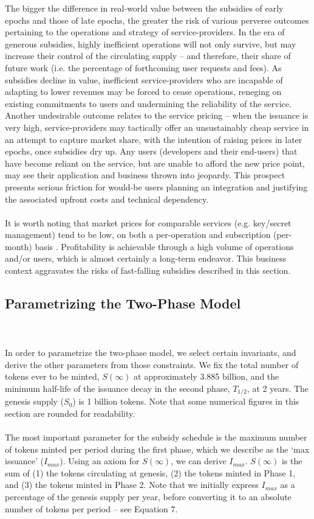 \documentclass[longbibliography,nofootinbib]{revtex4-1}
\begin{document}
The bigger the difference in real-world value between the subsidies of early epochs and those of late epochs, the greater the risk of various perverse outcomes pertaining to the operations and strategy of service-providers. In the era of generous subsidies, highly inefficient operations will not only survive, but may increase their control of the circulating supply – and therefore, their share of future work (i.e. the percentage of forthcoming user requests and fees). As subsidies decline in value, inefficient service-providers who are incapable of adapting to lower revenues may be forced to cease operations, reneging on existing commitments to users and undermining the reliability of the service. Another undesirable outcome relates to the service pricing – when the issuance is very high, service-providers may tactically offer an unsustainably cheap service in an attempt to capture market share, with the intention of raising prices in later epochs, once subsidies dry up. Any users (developers and their end-users) that have become reliant on the service, but are unable to afford the new price point, may see their application and business thrown into jeopardy. This prospect presents serious friction for would-be users planning an integration and justifying the associated upfront costs and technical dependency.
\\\\
It is worth noting that market prices for comparable services (e.g. key/secret management) tend to be low, on both a per-operation and subscription (per-month) basis \cite{Pricing:AWS}\cite{Pricing:GC}\cite{Pricing:MS}.  Profitability is achievable through a high volume of operations and/or users, which is almost certainly a long-term endeavor. This business context aggravates the risks of fast-falling subsidies described in this section. 

\subsection{Parametrizing the Two-Phase Model}

\\\\
In order to parametrize the two-phase model, we select certain invariants, and derive the other parameters from those constraints. We fix the total number of tokens ever to be minted, $S(\infty)$ at approximately 3.885 billion, and the minimum half-life of the issuance decay in the second phase, $T_{1/2}$, at 2 years. The genesis supply ($S_0$) is 1 billion tokens. Note that some numerical figures in this section are rounded for readability.
\\\\
The most important parameter for the subsidy schedule is the maximum number of tokens minted per period during the first phase, which we describe as the `max issuance' ($I_{max}$). Using an axiom for $S(\infty)$, we can derive $I_{max}$. $S(\infty)$ is the sum of (1) the tokens circulating at genesis, (2) the tokens minted in Phase 1, and (3) the tokens minted in Phase 2. Note that we initially express $I_{max}$ as a percentage of the genesis supply per year, before converting it to an absolute number of tokens per period – see Equation 7.
\end{document}
